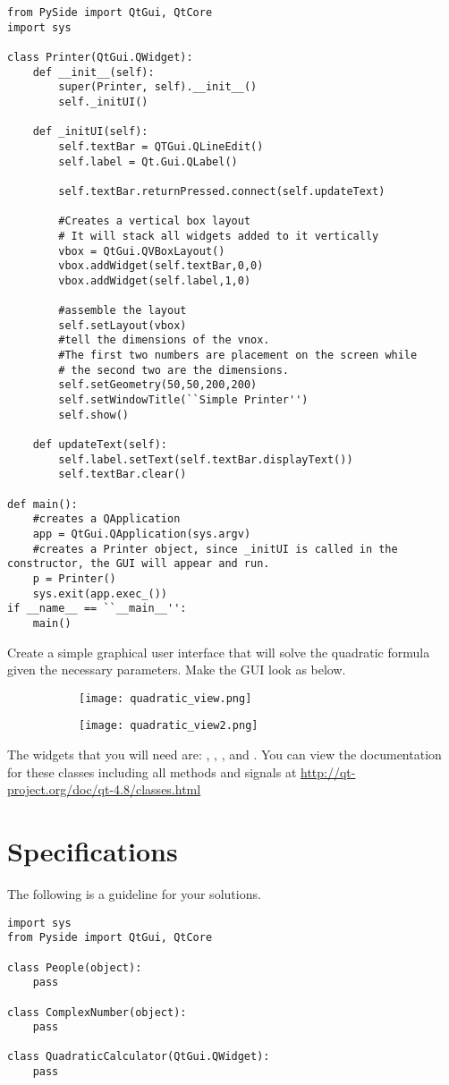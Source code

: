 \begin{lstlisting}
from PySide import QtGui, QtCore
import sys

class Printer(QtGui.QWidget):
	def __init__(self):
		super(Printer, self).__init__() 
		self._initUI()

	def _initUI(self): 
		self.textBar = QTGui.QLineEdit()
		self.label = Qt.Gui.QLabel()
		
		self.textBar.returnPressed.connect(self.updateText)
	
		#Creates a vertical box layout
		# It will stack all widgets added to it vertically
		vbox = QtGui.QVBoxLayout()
		vbox.addWidget(self.textBar,0,0)
		vbox.addWidget(self.label,1,0)
		
		#assemble the layout
		self.setLayout(vbox)
		#tell the dimensions of the vnox.
		#The first two numbers are placement on the screen while
		# the second two are the dimensions.
		self.setGeometry(50,50,200,200)
		self.setWindowTitle(``Simple Printer'')
		self.show()
	
	def updateText(self):
		self.label.setText(self.textBar.displayText())
		self.textBar.clear()
		
def main():
	#creates a QApplication
	app = QtGui.QApplication(sys.argv) 
	#creates a Printer object, since _initUI is called in the constructor, the GUI will appear and run.
	p = Printer()
	sys.exit(app.exec_())
if __name__ == ``__main__'':
	main()

\end{lstlisting}

\begin{problem}
Create a simple graphical user interface that will solve the quadratic formula given the necessary parameters.
Make the GUI look as below.
\begin{figure}[H]
\centering
\begin{subfigure}[b]{.49\textwidth}
\texttt{[image: quadratic\_view.png]}
\end{subfigure}
\begin{subfigure}[b]{.49\textwidth}
\texttt{[image: quadratic\_view2.png]}
\end{subfigure}
\end{figure}
The widgets that you will need are: , , , and .
You can view the documentation for these classes including all methods and signals at \url{http://qt-project.org/doc/qt-4.8/classes.html}
\label{prob:quadCalc}
\end{problem}


\section*{Specifications}

The following is a guideline for your solutions.

\begin{lstlisting}
import sys
from Pyside import QtGui, QtCore

class People(object):
	pass
	
class ComplexNumber(object):
	pass
	
class QuadraticCalculator(QtGui.QWidget):
	pass
\end{lstlisting}


